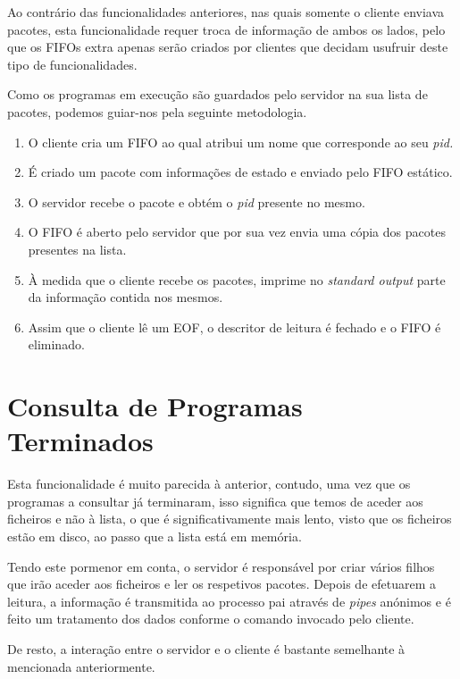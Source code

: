 \documentclass[12pt,a4paper]{report}
\begin{document}
        Ao contrário das funcionalidades anteriores, nas quais somente o cliente enviava pacotes, esta funcionalidade requer troca de informação de ambos os lados, pelo que os FIFOs extra apenas serão criados por clientes que decidam usufruir deste tipo de funcionalidades.

        Como os programas em execução são guardados pelo servidor na sua lista de pacotes, podemos guiar-nos pela seguinte metodologia.

        \begin{enumerate}
            \item O cliente cria um FIFO ao qual atribui um nome que corresponde ao seu \textit{pid.}
            \item É criado um pacote com informações de estado e enviado pelo FIFO estático.
            \item O servidor recebe o pacote e obtém o \textit{pid} presente no mesmo.
            \item O FIFO é aberto pelo servidor que por sua vez envia uma cópia dos pacotes presentes na lista.
            \item À medida que o cliente recebe os pacotes, imprime no \textit{standard output} parte da informação contida nos mesmos.
            \item Assim que o cliente lê um EOF, o descritor de leitura é fechado e o FIFO é eliminado.
        \end{enumerate}

    \section{Consulta de Programas Terminados}

        Esta funcionalidade é muito parecida à anterior, contudo, uma vez que os programas a consultar já terminaram, isso significa que temos de aceder aos ficheiros e não à lista, o que é significativamente mais lento, visto que os ficheiros estão em disco, ao passo que a lista está em memória.

        Tendo este pormenor em conta, o servidor é responsável por criar vários filhos que irão aceder aos ficheiros e ler os respetivos pacotes. Depois de efetuarem a leitura, a informação é transmitida ao processo pai através de \textit{pipes} anónimos e é feito um tratamento dos dados conforme o comando invocado pelo cliente.

        De resto, a interação entre o servidor e o cliente é bastante semelhante à mencionada anteriormente.
\end{document}
